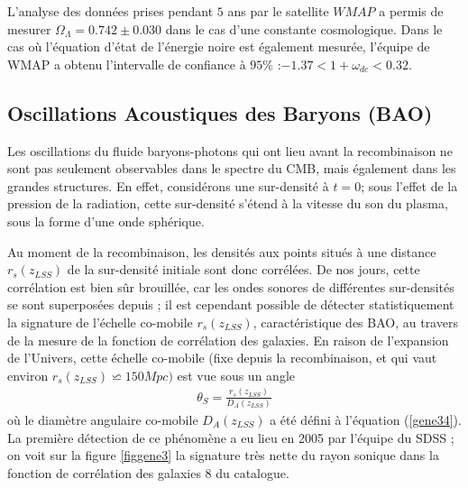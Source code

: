 \documentclass[a4paper,12pt]{report}
\theoremstyle{plain}
\theoremstyle{plain}
\begin{document}
L'analyse des donn\'ees prises pendant $5$ ans \cite{177} par le satellite $WMAP$ a permis de
mesurer $ \Omega_\Lambda = 0.742 \pm 0.030 $ dans le cas d'une constante cosmologique. Dans le cas o\`u
l'\'equation d'\'etat de l'\'energie noire est \'egalement mesur\'ee, l'\'equipe de WMAP a obtenu
l'intervalle de confiance \`a $95 \%$ :$ −1.37 < 1 + \omega_{de} < 0.32 $.
 
 \subsection{Oscillations Acoustiques des Baryons (BAO)}
 Les oscillations du fluide baryons-photons qui ont lieu avant la recombinaison ne sont
pas seulement observables dans le spectre du CMB, mais \'egalement dans les grandes 
structures. En effet, consid\'erons une sur-densit\'e \`a $ t = 0$; sous l'effet de la pression de la radiation,
cette sur-densit\'e s'\'etend \`a la vitesse du son du plasma, sous la forme d'une onde sph\'erique.

Au moment de la recombinaison, les densit\'es aux points situ\'es \`a une distance $ r_s (z_{LSS} )$
de la sur-densit\'e initiale sont donc corr\'el\'ees. De nos jours, cette corr\'elation est bien s\^ur
brouill\'ee, car les ondes sonores de diff\'erentes sur-densit\'es se sont superpos\'ees depuis ; il est
cependant possible de d\'etecter statistiquement la signature de l'\'echelle co-mobile $ r_s (z_{LSS} )$,
caract\'eristique des BAO, au travers de la mesure de la fonction de corr\'elation des galaxies.
En raison de l'expansion de l'Univers, cette \'echelle co-mobile (fixe depuis la recombinaison,
et qui vaut environ $ r_s (z_{LSS} ) \backsimeq 150 Mpc) $ est vue sous un angle
\begin{eqnarray}
 \theta_S = \frac{ r_s (z_{LSS} ) }{ D_A(z_{LSS} ) } \label{gene35}
\end{eqnarray}
o\`u le diam\`etre angulaire co-mobile $ D_A(z_{LSS} )$ a \'et\'e d\'efini \`a l'\'equation (\ref{gene34}). La premi\`ere
d\'etection de ce ph\'enom\`ene a eu lieu en 2005 par l'\'equipe du SDSS  \cite{115}; on voit sur
la figure \ref{figgene3} la signature tr\`es nette du rayon sonique dans la fonction de corr\'elation des
galaxies 8 du catalogue.

% 
\end{document}
